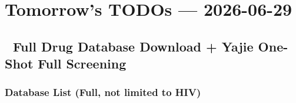 \documentclass[
  12pt,
]{article}
\author{SCX}
\date{2026}
\begin{document}
\section{Tomorrow's TODOs --- 2026-06-29}\label{tomorrows-todos-2026-06-29}

\subsection{🔴 Full Drug Database Download + Yajie One-Shot Full Screening}\label{full-drug-database-download-yajie-one-shot-full-screening}

\subsubsection{Database List (Full, not limited to HIV)}\label{database-list-full-not-limited-to-hiv}
\end{document}
